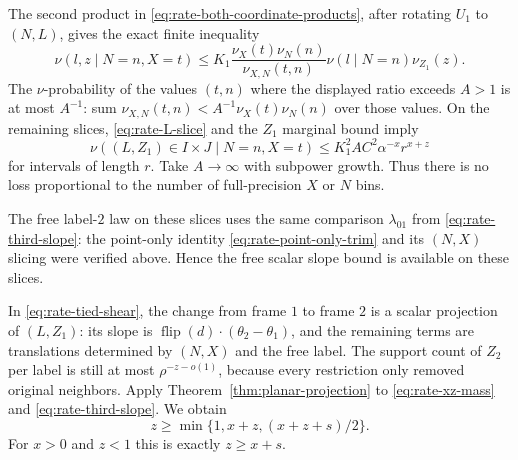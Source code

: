 The second product in \eqref{eq:rate-both-coordinate-products},
after rotating $U_1$ to $(N,L)$, gives the exact finite inequality
\begin{equation}\label{eq:rate-double-slice}
 \nu(l,z\mid N=n,X=t)
 \le K_1\frac{\nu_X(t)\nu_N(n)}{\nu_{X,N}(t,n)}
              \nu(l\mid N=n)\nu_{Z_1}(z).
\end{equation}
The $\nu$-probability of the values $(t,n)$ where the displayed
ratio exceeds $A>1$ is at most $A^{-1}$: sum
$\nu_{X,N}(t,n)<A^{-1}\nu_X(t)\nu_N(n)$ over those values.
On the remaining slices, \eqref{eq:rate-L-slice} and the $Z_1$
marginal bound imply
\begin{equation}\label{eq:rate-xz-mass}
 \nu((L,Z_1)\in I\times J\mid N=n,X=t)
       \le K_1^2 A C^2\alpha^{-x}r^{x+z}
\end{equation}
for intervals of length $r$. Take $A\to\infty$ with subpower
growth. Thus there is no loss proportional to the number of
full-precision $X$ or $N$ bins.

The free label-$2$ law on these slices uses the same comparison
$\lambda_{01}$ from \eqref{eq:rate-third-slope}: the point-only
identity \eqref{eq:rate-point-only-trim} and its $(N,X)$ slicing
were verified above.  Hence the free scalar slope bound is available
on these slices.

In \eqref{eq:rate-tied-shear}, the change from frame $1$ to frame
$2$ is a scalar projection of $(L,Z_1)$: its slope is
$\operatorname{flip}(d)\cdot(\theta_2-\theta_1)$, and the remaining
terms are translations determined by $(N,X)$ and the free label.
The support count of $Z_2$ per label is still at most
$\rho^{-z-o(1)}$, because every restriction only removed original
neighbors. Apply Theorem~\ref{thm:planar-projection} to
\eqref{eq:rate-xz-mass} and \eqref{eq:rate-third-slope}. We obtain
\begin{equation}\label{eq:rate-tied-xz}
 z\ge\min\{1,x+z,(x+z+s)/2\}.
\end{equation}
For $x>0$ and $z<1$ this is exactly $z\ge x+s$.

